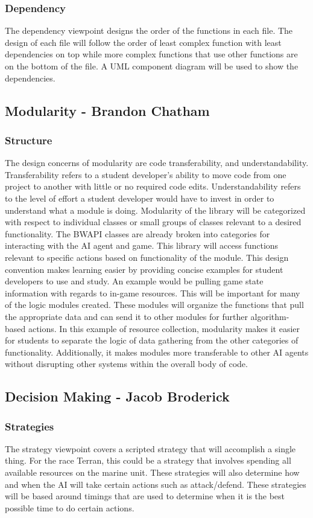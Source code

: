 \documentclass[10pt,letterpaper,onecolumn,draftclsnofoot]{IEEEtran}
\begin{document}
\subsubsection{Dependency}
	The dependency viewpoint designs the order of the functions in each file. The design of each file will follow the order of least complex function with least dependencies on top while more complex functions that use other functions are on the bottom of the file. A UML component diagram will be used to show the dependencies.
\subsection{Modularity - Brandon Chatham}
\subsubsection{Structure}
	The design concerns of modularity are code transferability, and understandability. Transferability refers to a student developer's ability to move code from one project to another with little or no required code edits. Understandability refers to the level of effort a student developer would have to invest in order to understand what a module is doing. Modularity of the library will be categorized with respect to individual classes or small groups of classes relevant to a desired functionality. The BWAPI classes are already broken into categories for interacting with the AI agent and game. This library will access functions relevant to specific actions based on functionality of the module. This design convention makes learning easier by providing concise examples for student developers to use and study.
	An example would be pulling game state information with regards to in-game resources. This will be important for many of the logic modules created. These modules will organize the functions that pull the appropriate data and can send it to other modules for further algorithm-based actions. In this example of resource collection, modularity makes it easier for students to separate the logic of data gathering from the other categories of functionality. Additionally, it makes modules more transferable to other AI agents without disrupting other systems within the overall body of code. 
\subsection{Decision Making - Jacob Broderick}
\subsubsection{Strategies}
	The strategy viewpoint covers a scripted strategy that will accomplish a single thing. For the race Terran, this could be a strategy that involves spending all available resources on the marine unit. These strategies will also determine how and when the AI will take certain actions such as attack/defend. These strategies will be based around timings that are used to determine when it is the best possible time to do certain actions.
\end{document}
